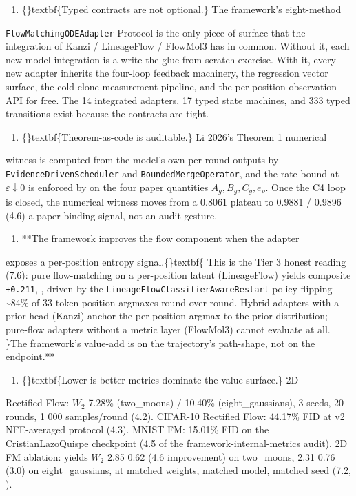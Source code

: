 \documentclass{article}
\begin{document}
\begin{enumerate}
\item \{\}textbf\{Typed contracts are not optional.\} The framework's eight-method
\end{enumerate}
\texttt{FlowMatchingODEAdapter} Protocol is the only piece of surface that the integration of Kanzi / LineageFlow / FlowMol3 has in common. Without it, each new model integration is a write-the-glue-from-scratch exercise. With it, every new adapter inherits the four-loop feedback machinery, the regression vector surface, the cold-clone measurement pipeline, and the per-position observation API for free. The 14 integrated adapters, 17 typed state machines, and 333 typed transitions exist because the contracts are tight.

\begin{enumerate}
\item \{\}textbf\{Theorem-as-code is auditable.\} Li 2026's Theorem 1 numerical
\end{enumerate}
witness  is computed from the model's own per-round outputs by \texttt{EvidenceDrivenScheduler} and \texttt{BoundedMergeOperator}, and the rate-bound at $\varepsilon \downarrow 0$ is enforced by  on the four paper quantities $A_g, B_g, C_g, e_\rho$. Once the C4 loop is closed, the numerical witness moves from a 0.8061 plateau to 0.9881 / 0.9896 (4.6)  a paper-binding signal, not an audit gesture.

\begin{enumerate}
\item **The framework improves the flow component when the adapter
\end{enumerate}
exposes a per-position entropy signal.\{\}textbf\{ This is the Tier 3 honest reading (7.6): pure flow-matching on a per-position latent (LineageFlow) yields composite \texttt{+0.211}, , driven by the \texttt{LineageFlowClassifierAwareRestart} policy flipping \textasciitilde{}84\% of 33 token-position argmaxes round-over-round. Hybrid adapters with a prior head (Kanzi) anchor the per-position argmax to the prior distribution; pure-flow adapters without a metric layer (FlowMol3) cannot evaluate at all. \}The framework's value-add is on the trajectory's path-shape, not on the endpoint.**

\begin{enumerate}
\item \{\}textbf\{Lower-is-better metrics dominate the value surface.\} 2D
\end{enumerate}
Rectified Flow: $W_2$ 7.28\% (two\_moons) / 10.40\% (eight\_gaussians), 3 seeds, 20 rounds, 1 000 samples/round (4.2). CIFAR-10 Rectified Flow: 44.17\% FID at v2 NFE-averaged protocol (4.3). MNIST FM: 15.01\% FID on the CristianLazoQuispe  checkpoint (4.5 of the framework-internal-metrics audit). 2D FM ablation:  yields $W_2$ 2.85  0.62 (4.6 improvement) on two\_moons, 2.31  0.76 (3.0) on eight\_gaussians, at matched weights, matched model, matched seed (7.2, ).
\end{document}
